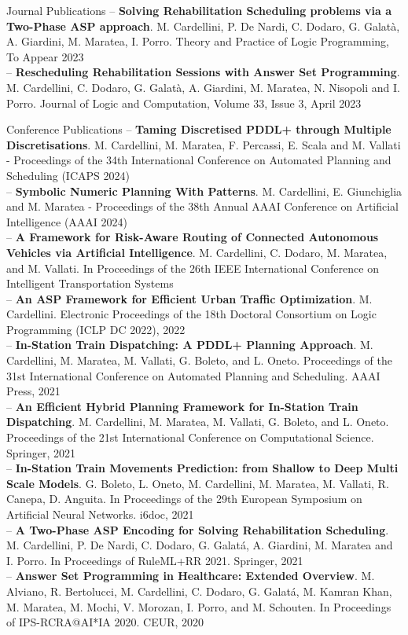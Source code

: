 \documentclass{resume} %
\begin{document}
\begin{rSection}{Journal Publications}
-- \textbf{Solving Rehabilitation Scheduling problems via a Two-Phase ASP approach}. M. Cardellini, P. De Nardi, C. Dodaro, G. Galat\`a, A. Giardini, M. Maratea, I. Porro. Theory and Practice of Logic Programming, To Appear 2023 \\
-- \textbf{Rescheduling Rehabilitation Sessions with Answer Set Programming}. M. Cardellini, C. Dodaro, G. Galat\`a, A. Giardini, M. Maratea, N. Nisopoli and I. Porro. Journal of Logic and Computation, Volume 33, Issue 3, April 2023
\end{rSection}
\begin{rSection}{Conference Publications}
-- \textbf{Taming Discretised PDDL+ through Multiple Discretisations}. M. Cardellini, M. Maratea, F. Percassi, E. Scala and M. Vallati - Proceedings of the 34th International Conference on Automated Planning and Scheduling (ICAPS 2024)\\
-- \textbf{Symbolic Numeric Planning With Patterns}. M. Cardellini, E. Giunchiglia and M. Maratea - Proceedings of the 38th Annual AAAI Conference on Artificial Intelligence (AAAI 2024) \\
-- \textbf{A Framework for Risk-Aware Routing of Connected Autonomous Vehicles via Artificial Intelligence}. M. Cardellini, C. Dodaro, M. Maratea, and M. Vallati. In Proceedings of the 26th IEEE International Conference on Intelligent Transportation Systems \\
-- \textbf{An ASP Framework for Efficient Urban Traffic Optimization}. M. Cardellini. Electronic Proceedings of the 18th Doctoral Consortium on Logic Programming (ICLP DC 2022), 2022 \\
-- \textbf{In-Station Train Dispatching: A PDDL+ Planning Approach}. M. Cardellini, M. Maratea, M. Vallati, G. Boleto, and L. Oneto. Proceedings of the 31st International Conference on Automated Planning and Scheduling. AAAI Press, 2021 \\
-- \textbf{An Efficient Hybrid Planning Framework for In-Station Train Dispatching}. M. Cardellini, M. Maratea, M. Vallati, G. Boleto, and L. Oneto. Proceedings of the 21st International Conference on Computational Science. Springer, 2021 \\
-- \textbf{In-Station Train Movements Prediction: from Shallow to Deep Multi Scale Models}. G. Boleto, L. Oneto, M. Cardellini, M. Maratea, M. Vallati, R. Canepa, D. Anguita. In Proceedings of the 29th European Symposium on Artificial Neural Networks. i6doc, 2021\\
-- \textbf{A Two-Phase ASP Encoding for Solving Rehabilitation Scheduling}. M. Cardellini, P. De Nardi, C. Dodaro, G. Galat\'a, A. Giardini, M. Maratea and I. Porro. In Proceedings of RuleML+RR 2021. Springer, 2021\\
-- \textbf{Answer Set Programming in Healthcare: Extended Overview}. M. Alviano, R. Bertolucci, M. Cardellini, C. Dodaro, G. Galat\'a, M. Kamran Khan, M. Maratea, M. Mochi, V. Morozan, I. Porro, and M. Schouten. In Proceedings of IPS-RCRA@AI*IA 2020. CEUR, 2020
\end{rSection}
\end{document}
